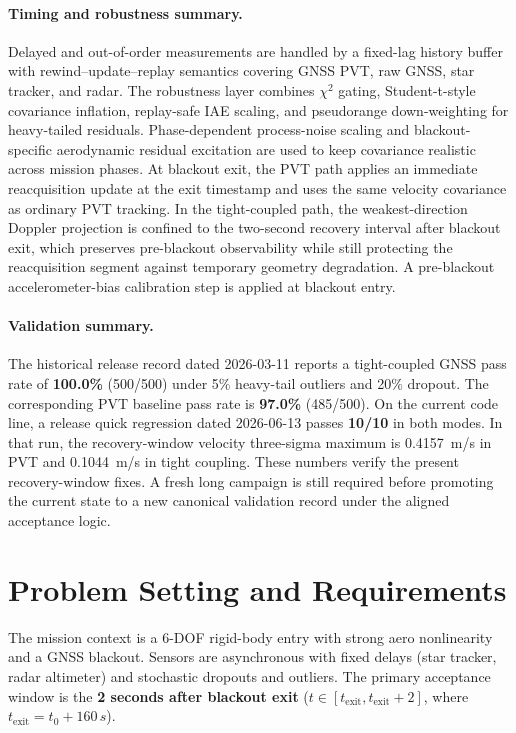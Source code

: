 \documentclass[10pt]{article}
\begin{document}
\paragraph{Timing and robustness summary.}
Delayed and out-of-order measurements are handled by a fixed-lag history buffer with rewind--update--replay semantics covering GNSS PVT, raw GNSS, star tracker, and radar. The robustness layer combines $\chi^2$ gating, Student-t-style covariance inflation, replay-safe IAE scaling, and pseudorange down-weighting for heavy-tailed residuals. Phase-dependent process-noise scaling and blackout-specific aerodynamic residual excitation are used to keep covariance realistic across mission phases. At blackout exit, the PVT path applies an immediate reacquisition update at the exit timestamp and uses the same velocity covariance as ordinary PVT tracking. In the tight-coupled path, the weakest-direction Doppler projection is confined to the two-second recovery interval after blackout exit, which preserves pre-blackout observability while still protecting the reacquisition segment against temporary geometry degradation. A pre-blackout accelerometer-bias calibration step is applied at blackout entry.

\paragraph{Validation summary.}
The historical release record dated 2026-03-11 reports a tight-coupled GNSS pass rate of
\textbf{100.0\%} (500/500) under 5\% heavy-tail outliers and 20\% dropout.
The corresponding PVT baseline pass rate is \textbf{97.0\%} (485/500).
On the current code line, a release quick regression dated 2026-06-13 passes \textbf{10/10} in both modes. In that run, the recovery-window velocity three-sigma maximum is \SI{0.4157}{m/s} in PVT and \SI{0.1044}{m/s} in tight coupling. These numbers verify the present recovery-window fixes. A fresh long campaign is still required before promoting the current state to a new canonical validation record under the aligned acceptance logic.

\section{Problem Setting and Requirements}
The mission context is a 6-DOF rigid-body entry with strong aero nonlinearity and a GNSS blackout.
Sensors are asynchronous with fixed delays (star tracker, radar altimeter) and stochastic dropouts and outliers.
The primary acceptance window is the \textbf{2 seconds after blackout exit}
($t \in [t_{\text{exit}}, t_{\text{exit}}+2]$, where $t_{\text{exit}}=t_0+160\,\si{s}$).
\end{document}
